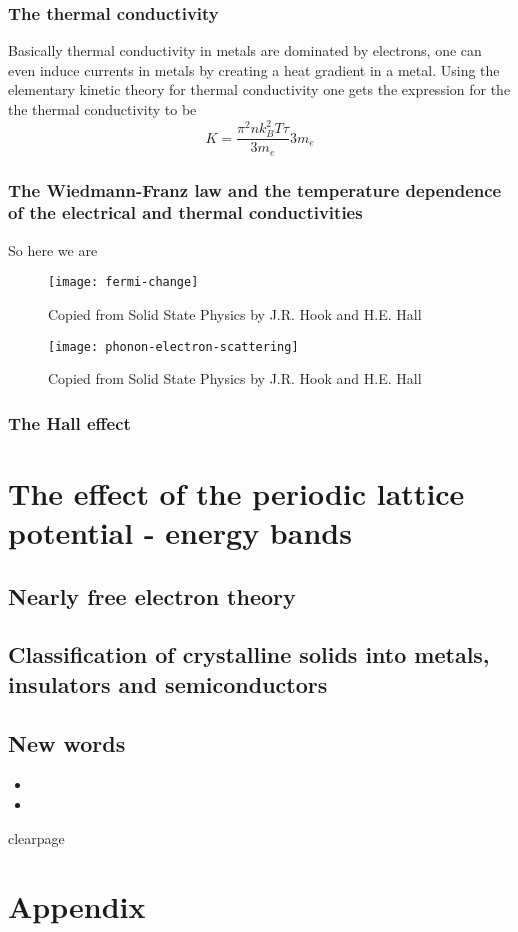 \documentclass[11pt]{article}
\begin{document}
\subsubsection{The thermal conductivity}
Basically thermal conductivity in metals are dominated by electrons, one can even induce currents in metals by creating a heat gradient in a metal. Using the elementary kinetic theory for thermal conductivity one gets the expression for the the thermal conductivity to be
\begin{equation}
K = \frac{\pi^2 nk_B^2 T \tau}{3m_e}{3m_e}
\end{equation}

\subsubsection{The Wiedmann-Franz law and the temperature dependence of the electrical and thermal conductivities}
So here we are
\begin{figure}[!ht]
	\centering
	\texttt{[image: fermi-change]}
	\caption{Copied from Solid State Physics by J.R. Hook and H.E. Hall}
	\label{fig:fermi-change}
\end{figure}
\begin{figure}[!ht]
	\centering
	\texttt{[image: phonon-electron-scattering]}
	\caption{Copied from Solid State Physics by J.R. Hook and H.E. Hall}
	\label{fig:phonon-electron-scattering}
\end{figure}

\subsubsection{The Hall effect}

\section{The effect of the periodic lattice potential - energy bands}
\subsection{Nearly free electron theory}
\subsection{Classification of crystalline solids into metals, insulators and semiconductors}

\newpage
\subsection{New words}
\begin{itemize}
	\item 
	\item
\end{itemize}
\newpage


\newpage
clearpage
\appendix
\section{Appendix}
\end{document}
